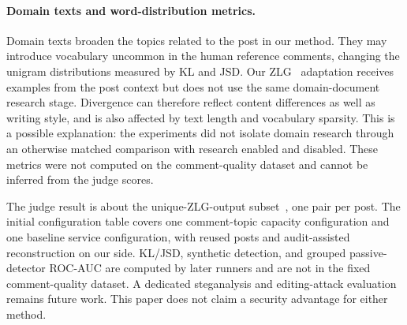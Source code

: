 \paragraph{Domain texts and word-distribution metrics.}
\label{par:baseline-domain-vocabulary}
Domain texts broaden the topics related to the post in our method. They may introduce vocabulary uncommon in the human reference comments, changing the unigram distributions measured by KL and JSD. Our ZLG~\cite{lin2024zero} adaptation receives examples from the post context but does not use the same domain-document research stage. Divergence can therefore reflect content differences as well as writing style, and is also affected by text length and vocabulary sparsity. This is a possible explanation: the experiments did not isolate domain research through an otherwise matched comparison with research enabled and disabled. These metrics were not computed on the comment-quality dataset and cannot be inferred from the judge scores.

The judge result is about the unique-ZLG-output subset~\cite{lin2024zero}, one pair per post.
The initial configuration table covers one comment-topic capacity configuration and one baseline service configuration, with reused posts and audit-assisted reconstruction on our side.
KL/JSD, synthetic detection, and grouped passive-detector ROC-AUC are computed by later runners and are not in the fixed comment-quality dataset.
A dedicated steganalysis and editing-attack evaluation remains future work.
This paper does not claim a security advantage for either method.
\FloatBarrier
\flushbottom
